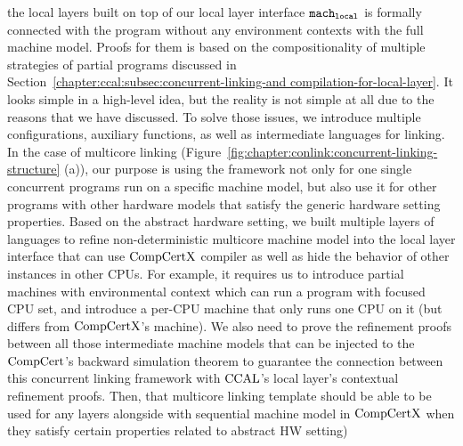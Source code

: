 the local layers built on top of our local layer interface ${\mathrm{\texttt{mach}}}_{{\mathrm{\texttt{local}}}}$ is 
formally connected with the program without any environment contexts with the full machine model. 
Proofs for them is based on the compositionality of multiple strategies 
of partial programs discussed in Section~\ref{chapter:ccal:subsec:concurrent-linking-and compilation-for-local-layer}.   
It looks simple in a high-level idea, but the reality is not simple at all
due to the reasons that we have discussed.  
To solve those issues, 
we introduce multiple configurations, auxiliary functions, as well as intermediate languages for linking. 
In the case of multicore linking (Figure~\ref{fig:chapter:conlink:concurrent-linking-structure} (a)),
our purpose is using the framework not only for one single concurrent programs run on a specific machine model, 
but also use it for other programs with other hardware models that satisfy the generic hardware setting properties. 
Based on the abstract hardware setting, 
we built multiple layers of languages to refine non-deterministic multicore machine model 
into the local layer interface that can use $\mathrm{CompCertX}$ compiler as well as 
hide the behavior of other instances in other CPUs.
For example, 
it requires us to introduce partial machines with environmental context which can run a program with focused CPU set, 
and introduce a per-CPU machine that only runs one CPU on it (but differs from $\mathrm{CompCertX}$'s machine). 
We also need to prove the refinement proofs between all those intermediate machine models
that can be injected to the $\mathrm{CompCert}$'s backward simulation theorem to guarantee the connection between this concurrent linking framework with $\mathrm{CCAL}$'s local layer's contextual refinement proofs. 
Then, that multicore linking template should be able to be used for any layers alongside with sequential machine model in $\mathrm{CompCertX}$ when they satisfy certain properties related to abstract HW setting)

